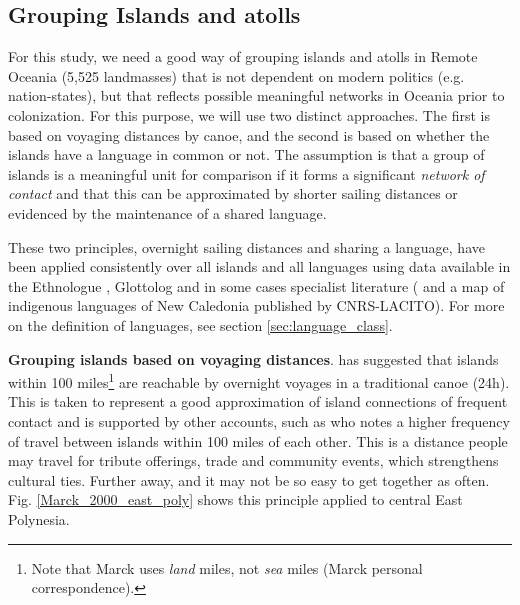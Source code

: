 \documentclass[unnumsec,webpdf,modern,medium]{oup-authoring-template}
\begin{document}
\begin{appendices}
\FloatBarrier
\subsection{Grouping Islands and atolls}
\label{sec:island_geo}


For this study, we need a good way of grouping islands and atolls in Remote Oceania (5,525 landmasses) that is not dependent on modern politics (e.g. nation-states), but that reflects possible meaningful networks in Oceania prior to colonization. For this purpose, we will use two distinct approaches. The first is based on voyaging distances by canoe, and the second is based on whether the islands have a language in common or not. The assumption is that a group of islands is a meaningful unit for comparison if it forms a significant \textit{network of contact} and that this can be approximated by shorter sailing distances or evidenced by the maintenance of a shared language. 

These two principles, overnight sailing distances and sharing a language, have been applied consistently over all islands and all languages using data available in the Ethnologue \citep{ethnologue22}, Glottolog \citep{glottolog3} and in some cases specialist literature (\citet{faaniu1983tuvalu,charpentier2012linguistic, francoisetatl2015, macdonald_2020, omniglot_tuvaluan} and a map of indigenous languages of New Caledonia published by CNRS-LACITO). For more on the definition of languages, see section \ref{sec:language_class}.




\textbf{Grouping islands based on voyaging distances}. \citet{mark_1986, marck2000} has suggested that islands within 100 miles\footnote{Note that Marck uses \emph{land} miles, not \emph{sea} miles (Marck personal correspondence).} are reachable by overnight voyages in a traditional canoe (24h). This is taken to represent a good approximation of island connections of frequent contact and is supported by other accounts, such as \citep[38]{gladwin2009east} who notes a higher frequency of travel between islands within 100 miles of each other. This is a distance people may travel for tribute offerings, trade and community events, which strengthens cultural ties. Further away, and it may not be so easy to get together as often. Fig. \ref{Marck_2000_east_poly} shows this principle applied to central East Polynesia.


\end{appendices}
\end{document}
